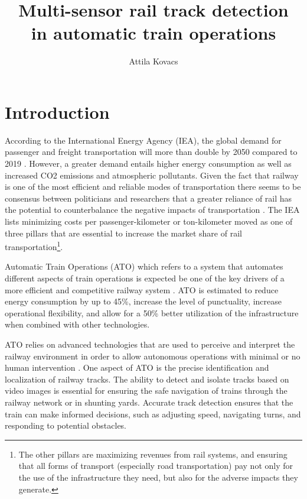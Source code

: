 \documentclass[Master,MDS,english]{BASE/twbook} %
\title{Multi-sensor rail track detection \\ in automatic train operations}
\author{Attila Kovacs}
\begin{document}
\maketitle

\chapter{Introduction} %


According to the International Energy Agency (IEA), the global demand for passenger and freight transportation will more than double by 2050 compared to 2019 \citep{IEA2019}. However, a greater demand entails higher energy consumption as well as increased CO2 emissions and atmospheric pollutants.  
Given the fact that railway is one of the most efficient and reliable modes of transportation there seems to be consensus between politicians and researchers that a greater reliance of rail has the potential to counterbalance the negative impacts of transportation \citep{islam2016make, pagand2020fostering}.
The IEA lists minimizing costs per passenger-kilometer or ton-kilometer moved as one of three pillars that are essential to increase the market share of rail transportation\footnote {The other pillars are maximizing revenues from rail systems, and ensuring that all forms of transport (especially road transportation) pay not only for the use of the infrastructure they need, but also for the adverse impacts they generate.}.

Automatic Train Operations (ATO) which refers to a system that automates different aspects of train operations is expected be one of the key drivers of a more efficient and competitive railway system \citep{ERJU2019, ALSTOM2021}. ATO is estimated to reduce energy consumption by up to 45\%, increase the level of punctuality, increase operational flexibility, and allow for a 50\% better utilization of the infrastructure when combined with other technologies.

ATO relies on advanced technologies that are used to perceive and interpret the railway environment in order to allow autonomous operations with minimal or no human intervention \citep{DB2024}. 
One aspect of ATO is the precise identification and localization of railway tracks. The ability to detect and isolate tracks based on video images is essential for ensuring the safe navigation of trains through the railway network or in shunting yards. Accurate track detection ensures that the train can make informed decisions, such as adjusting speed, navigating turns, and responding to potential obstacles.
\end{document}
